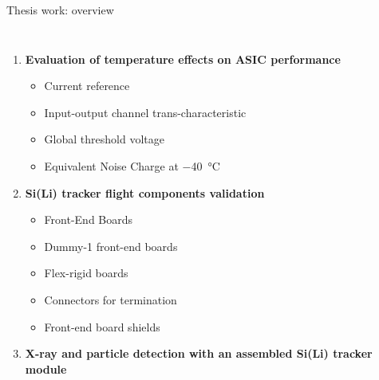 \documentclass[aspectratio=169,xcolor=dvipsnames,handout]{beamer} %
\begin{document}

\begin{frame}{Thesis work: overview}
    \addtolength{\leftmargini}{\labelsep}
    \begin{columns}
        \vspace{-0.2cm}
        \fontsize{11pt}{1}\selectfont
        \pause
        \begin{enumerate}
            \setlength\itemsep{1em}
            \fontsize{10pt}{1}\selectfont
            \item \textbf{Evaluation of temperature effects on ASIC performance}
            \begin{itemize}
                \fontsize{8.5pt}{1}\selectfont
                \setlength\itemsep{0.3em}
                \item Current reference
                \item Input-output channel trans-characteristic
                \item Global threshold voltage
                \item Equivalent Noise Charge at \SI{-40}{\celsius}
            \end{itemize}\pause
            \fontsize{10pt}{1}\selectfont
            \item \textbf{Si(Li) tracker flight components validation}
            \begin{itemize}
                \fontsize{8.5pt}{1}\selectfont
                \setlength\itemsep{0.3em}
                \item Front-End Boards
                \item Dummy-1 front-end boards
                \item Flex-rigid boards
                \item Connectors for termination
                \item Front-end board shields
            \end{itemize}\pause
            \fontsize{10pt}{1}\selectfont
            \item \textbf{X-ray and particle detection with an assembled Si(Li) tracker module}
            \begin{itemize}
                \fontsize{8.5pt}{1}\selectfont

\end{itemize}
\end{enumerate}
\end{columns}
\end{frame}
\end{document}
